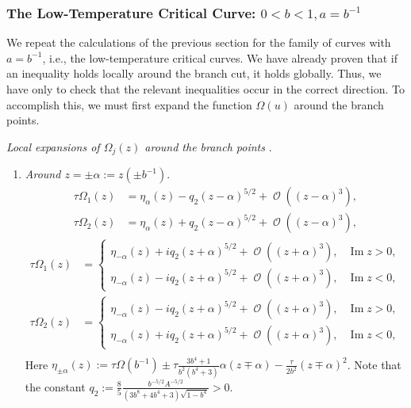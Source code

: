\documentclass[pdftex]{sigma}
\DeclareMathOperator{\OO}{\mathcal{O}}
\numberwithin{equation}{section}
\begin{document}
\iffalse
\subsubsection{The Low-Temperature Critical Curve: $0< b < 1, a = b^{-1}$}
We repeat the calculations of the previous section for the family of curves with $a = b^{-1}$, i.e., the low-temperature critical curves. We have already proven that if
an inequality holds locally around the branch cut, it holds globally. Thus, we have only to check that the relevant inequalities occur in the correct direction. To accomplish this, we must first expand the function $\Omega(u)$ around the branch points.

\begin{prop}\label{local-expansions-low-temp}
\textit{ Local expansions of $\Omega_j(z)$ around the branch points }.
 \begin{enumerate}\itemsep=0pt
 \item \textit{Around $z = \pm\alpha := z(\pm b^{-1}).$}
 \begin{align}
 \tau\Omega_1(z) &= \eta_\alpha(z) - q_2 (z-\alpha)^{5/2} + \OO((z-\alpha)^3),\\
 \tau\Omega_2(z) &= \eta_\alpha(z) + q_2 (z-\alpha)^{5/2} + \OO((z-\alpha)^3),
 \end{align}
 \begin{align}
 \tau\Omega_1(z) &=
 \begin{cases}
 \eta_{-\alpha}(z) + iq_2 (z+\alpha)^{5/2} + \OO((z+\alpha)^3), & \operatorname{Im} z>0,\\
 \eta_{-\alpha}(z) - iq_2 (z+\alpha)^{5/2} + \OO((z+\alpha)^3),& \operatorname{Im} z <0,
 \end{cases}\\
 \tau\Omega_2(z) &=
 \begin{cases}
 \eta_{-\alpha}(z) - iq_2 (z+\alpha)^{5/2} + \OO((z+\alpha)^3), & \operatorname{Im} z>0,\\
 \eta_{-\alpha}(z) + iq_2 (z+\alpha)^{5/2} + \OO((z+\alpha)^3),& \operatorname{Im} z <0,
 \end{cases}\\
 \end{align}
 Here $\eta_{\pm\alpha}(z) := \tau \Omega(b^{-1}) \pm \tau\frac{ 3b^4 + 1}{b^2(b^4 + 3)}\alpha (z\mp\alpha) - \frac{\tau}{2b^2} (z\mp\alpha)^2$. Note that the constant $q_2:=\frac{8}{5}\frac{b^{-5/2}A^{-5/2}}{(3b^8 + 4b^4 + 3)\sqrt{1-b^4} } >0$.


\end{enumerate}
\end{prop}
\end{document}
